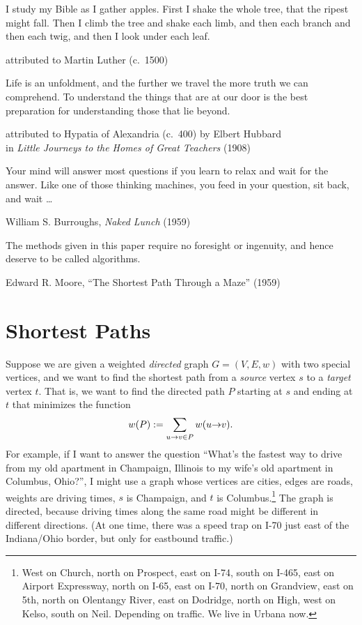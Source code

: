 \epigraph{I study my Bible as I gather apples. First I shake the whole tree, that the ripest might fall. Then I climb the tree and shake each limb, and then each branch and then each twig, and then I look under each leaf.}{attributed to Martin Luther (c.~1500)}

\epigraph{Life is an unfoldment, and the further we travel the more truth we can comprehend. To understand the things that are at our door is the best preparation for understanding those that lie beyond.}{attributed to Hypatia of Alexandria (c.~400) by Elbert Hubbard\\in \textit{Little Journeys to the Homes of Great Teachers} (1908)}

\epigraph{Your mind will answer most questions if you learn to relax and wait for the answer. Like one of those thinking machines, you feed in your question, sit back, and wait \dots}{William S. Burroughs, \textit{Naked Lunch} (1959)}

\epigraph{The methods given in this paper require no foresight or ingenuity, and hence deserve to be called algorithms.}{Edward R. Moore, “The Shortest Path Through a Maze” (1959)}

\chapter{Shortest Paths}
\label{ch:8}

Suppose we are given a weighted \textit{directed} graph $G = (V, E, w)$ with two special vertices, and we want to find the shortest path from a \textit{source} vertex $s$ to a \textit{target} vertex $t$.
That is, we want to find the directed path $P$ starting at $s$ and ending at $t$ that minimizes the function
\[
w(P) := \sum_{u\mathord{\rightarrow}v \in P} w(u\mathord{\rightarrow}v).
\]
For example, if I want to answer the question “What’s the fastest way to drive from my old apartment in Champaign, Illinois to my wife’s old apartment in Columbus, Ohio?”, I might use a graph whose vertices are cities, edges are roads, weights are driving times, $s$ is Champaign, and $t$ is Columbus.\footnote{West on Church, north on Prospect, east on I-74, south on I-465, east on Airport Expressway, north on I-65, east on I-70, north on Grandview, east on 5th, north on Olentangy River, east on Dodridge, north on High, west on Kelso, south on Neil. Depending on traffic. We live in Urbana now.}
The graph is directed, because driving times along the same road might be different in different directions.
(At one time, there was a speed trap on I-70 just east of the Indiana/Ohio border, but only for eastbound traffic.)

